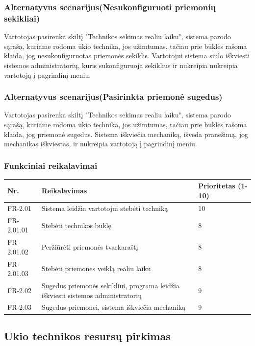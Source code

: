 \documentclass[oneside]{VUMIFPSkursinis}
\begin{document}
\subsubsection{Alternatyvus scenarijus(Nesukonfiguruoti priemonių sekikliai)}
	Vartotojas pasirenka skiltį "Technikos sekimas realiu laiku", sistema parodo sąrašą, kuriame rodoma ūkio technika, jos užimtumas, tačiau prie būklės rašoma klaida, jog nesukonfiguruotas priemonės sekiklis. Vartotojui sistema siūlo iškviesti sistemos administratorių, kuris sukonfiguruoja sekiklius ir nukreipia nukreipia vartotoją į pagrindinį meniu.
\subsubsection{Alternatyvus scenarijus(Pasirinkta priemonė sugedus)}
	Vartotojas pasirenka skiltį "Technikos sekimas realiu laiku", sistema parodo sąrašą, kuriame rodoma ūkio technika, jos užimtumas, tačiau prie būklės rašoma klaida, jog priemonė sugedus. Sistema iškviečia mechaniką, išveda pranešimą, jog mechanikas iškviestas, ir nukreipia vartotoją į pagrindinį meniu.
\subsubsection{Funkciniai reikalavimai}
\begin{table}[htbp]
	\begin{tabularx}{1\textwidth}{ |P{2.5cm}|X|P{3cm }| }  \hline
           	Nr. & Reikalavimas &  Prioritetas (1-10)  \\   \hline 
         	FR-2.01 & Sistema leidžia vartotojui stebėti techniką & 10  \\   \hline
		FR-2.01.01 & Stebėti technikos būklę & 8 \\ \hline
		FR-2.01.02 & Peržiūrėti priemonės tvarkaraštį & 8 \\ \hline
		FR-2.01.03 & Stebėti priemonės veiklą realiu laiku & 8 \\ \hline
        	FR-2.02 & Sugedus priemonės sekikliui, programa leidžia iškviesti sistemos administratorių & 9   \\   \hline
		FR-2.03 & Sugedus priemonei, sistema iškviečia mechaniką & 9 \\ \hline
	\end{tabularx}
\end{table}

\subsection{Ūkio technikos resursų pirkimas}
\end{document}
